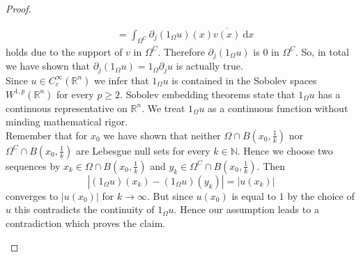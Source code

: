 \documentclass[10pt,a4paper]{amsart}
\def\N{\mathbb{N}}
\def\R{\mathbb{R}}
\begin{document}
\begin{proof}
\begin{enumerate}[i.)]
\begin{align*}
& = \int_{\Omega^{C}} \partial_{j}(1_{\Omega} u)(x) \overline{v(x)} \ \mathrm{d}x 
\end{align*}
holds due to the support of $v$ in $\Omega^{C}$. Therefore $\partial_{j}(1_{\Omega} u)$ is $0$ in $\Omega^{C}$. So, 
in total we have shown that $\partial_{j} (1_{\Omega} u) = 1_{\Omega} \partial_{j}u$ is actually true.\\
Since $u \in C_{c}^{\infty}(\R^{n})$ we infer that $1_{\Omega} u$ is contained in the Sobolev spaces 
$W^{1,p}(\R^{n})$ for every $p \geq 2$. Sobolev embedding theorems state that $1_{\Omega} u$ has a 
continuous representative on $\R^{n}$. We treat $1_{\Omega} u$ as a continuous function without minding mathematical rigor.\\

Remember that for $x_{0}$ we have shown that neither $\Omega \cap B(x_{0},\frac{1}{k})$ nor $\Omega^{C} \cap B(x_{0},\frac{1}{k})$
are Lebesgue null sets for every $k \in \N$. Hence we choose two sequences by
$x_{k} \in \Omega \cap B(x_{0},\frac{1}{k})$ and $y_{k} \in \Omega^{C} \cap B(x_{0},\frac{1}{k})$. Then 
$$ 
|(1_{\Omega} u)(x_{k}) -  (1_{\Omega} u)(y_{k})| = |u(x_{k})|
$$
converges to $|u(x_{0})|$ for $k \to \infty$. But since $u(x_{0})$ is equal to $1$ by the choice of $u$ this contradicts the 
continuity of $1_{\Omega} u$. Hence our assumption leads to a contradiction which proves the claim.
\end{enumerate}
\end{proof}
\end{document}

